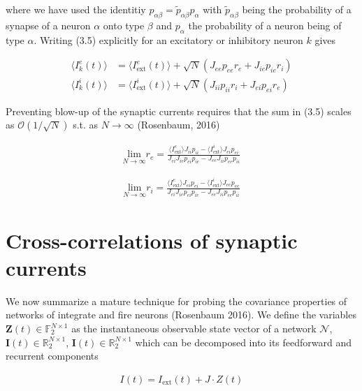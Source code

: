 \documentclass{ucetd}
\begin{document}
where we have used the identitiy $p_{\alpha\beta} = \tilde{p}_{\alpha\beta}p_{\alpha}$ with $\tilde{p}_{\alpha\beta}$ being the probability of a synapse of a neuron $\alpha$ onto type $\beta$ and $p_{\alpha}$ the probability of a neuron being of type $\alpha$. Writing (3.5) explicitly for an excitatory or inhibitory neuron $k$ gives

\begin{align}
\langle I_{k}^{e}(t)\rangle &= \langle I_{\mathrm{ext}}^{e}(t)\rangle + \sqrt{N}\left(J_{ee}p_{ee}r_{e} + J_{ie}p_{ie}r_{i}\right)\\
\langle I_{k}^{i}(t)\rangle &= \langle I_{\mathrm{ext}}^{i}(t)\rangle + \sqrt{N}\left(J_{ii}p_{ii}r_{i} + J_{ei}p_{ei}r_{e}\right)
\end{align}


Preventing blow-up of the synaptic currents requires that the sum in (3.5) scales as $\mathcal{O}\left(1/\sqrt{N}\right)$ s.t. as $N\rightarrow \infty$ (Rosenbaum, 2016)

\begin{align}
\underset{N\rightarrow \infty}{\mathrm{lim}}r_{e} = \frac{\langle I_{\mathrm{ext}}^{e}\rangle J_{ii}p_{ii} - \langle I_{\mathrm{ext}}^{i}\rangle J_{ei}p_{ei}}{J_{ei}J_{ie}p_{ei}p_{ie} - J_{ee}J_{ii}p_{ee}p_{ii}}
\end{align}

\begin{align}
\underset{N\rightarrow \infty}{\mathrm{lim}}r_{i} = \frac{\langle I_{\mathrm{ext}}^{e}\rangle J_{ei}p_{ei} - \langle I_{\mathrm{ext}}^{i}\rangle J_{ee}p_{ee}}{J_{ei}J_{ie}p_{ei}p_{ie} - J_{ee}J_{ii}p_{ee}p_{ii}}
\end{align}

\section{Cross-correlations of synaptic currents}

We now summarize a mature technique for probing the covariance properties of networks of integrate and fire neurons (Rosenbaum 2016). We define the variables $\mathbf{Z}(t)\in \mathbb{F}_{2}^{N\times 1}$ as the instantaneous observable state vector of a network $\mathcal{N}$, $\mathbf{I}(t)\in \mathbb{R}_{2}^{N\times 1}$, $\mathbf{I}(t)\in \mathbb{R}_{2}^{N\times 1}$ which can be decomposed into its feedforward and recurrent components

\begin{align}
I(t) = I_{\mathrm{ext}}(t) + J\cdot Z(t)
\end{align}
\end{document}
